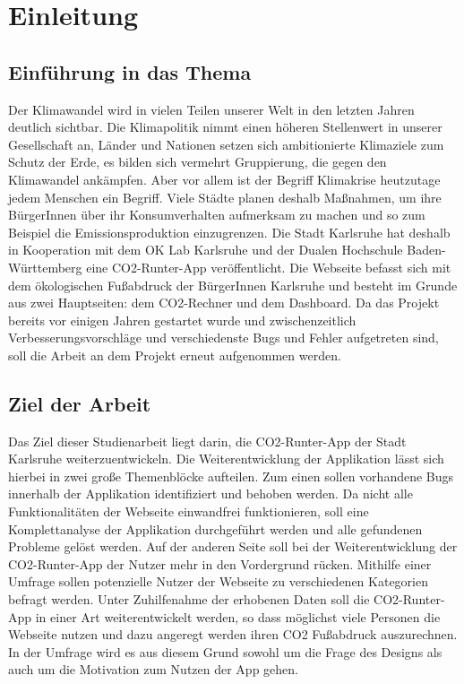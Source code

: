 
\chapter{Einleitung}
\label{chapter:1}

\section{Einführung in das Thema}

Der Klimawandel wird in vielen Teilen unserer Welt in den letzten Jahren deutlich sichtbar.  Die Klimapolitik nimmt einen höheren Stellenwert in unserer Gesellschaft an, Länder und Nationen setzen sich ambitionierte Klimaziele zum Schutz der Erde, es bilden sich vermehrt Gruppierung, die gegen den Klimawandel ankämpfen. Aber vor allem ist der Begriff Klimakrise heutzutage jedem Menschen ein Begriff. Viele Städte planen deshalb Maßnahmen, um ihre BürgerInnen über ihr Konsumverhalten aufmerksam zu machen und so zum Beispiel die Emissionsproduktion einzugrenzen.  Die Stadt Karlsruhe hat deshalb in Kooperation mit dem OK Lab Karlsruhe und der Dualen Hochschule Baden-Württemberg eine CO2-Runter-App veröffentlicht. Die Webseite befasst sich mit dem ökologischen Fußabdruck der BürgerInnen Karlsruhe und besteht im Grunde aus zwei Hauptseiten: dem CO2-Rechner und dem Dashboard. Da das Projekt bereits vor einigen Jahren gestartet wurde und zwischenzeitlich Verbesserungsvorschläge und verschiedenste Bugs und Fehler aufgetreten sind, soll die Arbeit an dem Projekt erneut aufgenommen werden.


\section{Ziel der Arbeit}

Das Ziel dieser Studienarbeit liegt darin, die CO2-Runter-App der Stadt Karlsruhe weiterzuentwickeln. Die Weiterentwicklung der Applikation lässt sich hierbei in zwei große Themenblöcke aufteilen. Zum einen sollen vorhandene Bugs innerhalb der Applikation identifiziert und behoben werden. Da nicht alle Funktionalitäten der Webseite einwandfrei funktionieren, soll eine Komplettanalyse der Applikation durchgeführt werden und alle gefundenen Probleme gelöst werden. Auf der anderen Seite soll bei der Weiterentwicklung der CO2-Runter-App der Nutzer mehr in den Vordergrund rücken. Mithilfe einer Umfrage sollen potenzielle Nutzer der Webseite zu verschiedenen Kategorien befragt werden. Unter Zuhilfenahme der erhobenen Daten soll die CO2-Runter-App in einer Art weiterentwickelt werden, so dass möglichst viele Personen die Webseite nutzen und dazu angeregt werden ihren CO2 Fußabdruck auszurechnen. In der Umfrage wird es aus diesem Grund sowohl um die Frage des Designs als auch um die Motivation zum Nutzen der App gehen.

